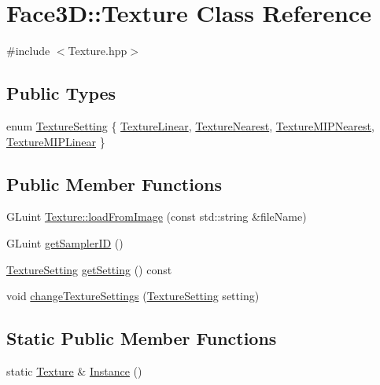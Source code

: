 \hypertarget{class_face3_d_1_1_texture}{}\section{Face3D\+:\+:Texture Class Reference}
\label{class_face3_d_1_1_texture}


{\ttfamily \#include $<$Texture.\+hpp$>$}

\subsection*{Public Types}
\begin{DoxyCompactItemize}
\item 
enum \hyperlink{class_face3_d_1_1_texture_aa2d0d0213ac74b112ce13cf5511a0573}{Texture\+Setting} \{ \hyperlink{class_face3_d_1_1_texture_aa2d0d0213ac74b112ce13cf5511a0573a14d9ede2b469d8bdeb6104a7e3e3297f}{Texture\+Linear}, 
\hyperlink{class_face3_d_1_1_texture_aa2d0d0213ac74b112ce13cf5511a0573a97cc8a0412885c34a8f6a0245fad6734}{Texture\+Nearest}, 
\hyperlink{class_face3_d_1_1_texture_aa2d0d0213ac74b112ce13cf5511a0573a3e3b46677c939a73b353a823c5606e27}{Texture\+M\+I\+P\+Nearest}, 
\hyperlink{class_face3_d_1_1_texture_aa2d0d0213ac74b112ce13cf5511a0573a9d4b4ece6a682bd39df531f0ddc28988}{Texture\+M\+I\+P\+Linear}
 \}
\end{DoxyCompactItemize}
\subsection*{Public Member Functions}
\begin{DoxyCompactItemize}
\item 
G\+Luint \hyperlink{class_face3_d_1_1_texture_a297188d7d9549841d4351d8d0017aadf}{Texture\+::load\+From\+Image} (const std\+::string \&file\+Name)
\item 
G\+Luint \hyperlink{class_face3_d_1_1_texture_ac579a87306902c623255a446c26f14b9}{get\+Sampler\+ID} ()
\item 
\hyperlink{class_face3_d_1_1_texture_aa2d0d0213ac74b112ce13cf5511a0573}{Texture\+Setting} \hyperlink{class_face3_d_1_1_texture_a975cd5d43b1a8009df6498d81c539851}{get\+Setting} () const 
\item 
void \hyperlink{class_face3_d_1_1_texture_aa7f450d79daebff981fb5a7dc3c9a85e}{change\+Texture\+Settings} (\hyperlink{class_face3_d_1_1_texture_aa2d0d0213ac74b112ce13cf5511a0573}{Texture\+Setting} setting)
\end{DoxyCompactItemize}
\subsection*{Static Public Member Functions}
\begin{DoxyCompactItemize}
\item 
static \hyperlink{class_face3_d_1_1_texture}{Texture} \& \hyperlink{class_face3_d_1_1_texture_a1e8b06b1ae91ab8256b36dad8d6ec389}{Instance} ()
\end{DoxyCompactItemize}
